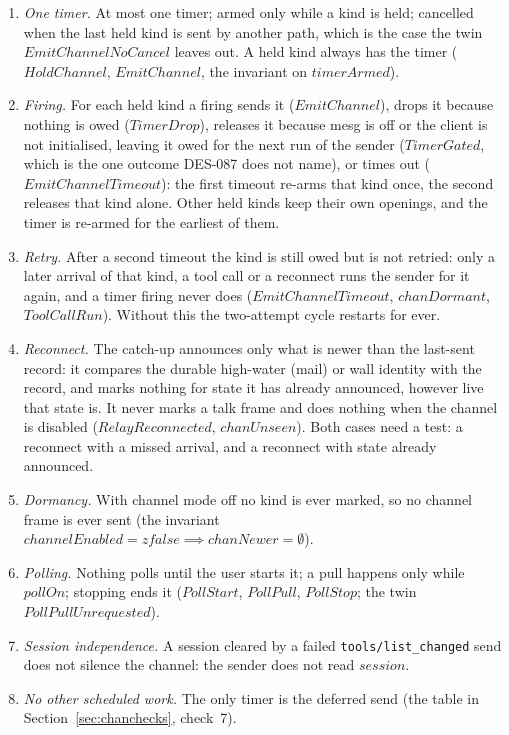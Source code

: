 \documentclass[a4paper,10pt,fleqn]{article}
\begin{document}
\begin{enumerate}
    $rateLimit$ in a sliding ten minutes, tested with a fake clock; arrivals
    in a window coalesce into the next event ($WindowOpen$, $HoldChannel$;
    the twin $EmitChannelBurst$).
  \item \emph{One timer.}  At most one timer; armed only while a kind is
    held; cancelled when the last held kind is sent by another path, which
    is the case the twin $EmitChannelNoCancel$ leaves out.  A held kind
    always has the timer ($HoldChannel$, $EmitChannel$, the invariant on
    $timerArmed$).
  \item \emph{Firing.}  For each held kind a firing sends it ($EmitChannel$),
    drops it because nothing is owed ($TimerDrop$), releases it because mesg
    is off or the client is not initialised, leaving it owed for the next
    run of the sender ($TimerGated$, which is the one outcome DES-087 does
    not name), or times out ($EmitChannelTimeout$): the first timeout
    re-arms that kind once, the second releases that kind alone.  Other held
    kinds keep their own openings, and the timer is re-armed for the earliest
    of them.
  \item \emph{Retry.}  After a second timeout the kind is still owed but is
    not retried: only a later arrival of that kind, a tool call or a
    reconnect runs the sender for it again, and a timer firing never does
    ($EmitChannelTimeout$, $chanDormant$, $ToolCallRun$).  Without this
    the two-attempt cycle restarts for ever.
  \item \emph{Reconnect.}  The catch-up announces only what is newer than
    the last-sent record: it compares the durable high-water (mail) or wall
    identity with the record, and marks nothing for state it has already
    announced, however live that state is.  It never marks a talk frame and
    does nothing when the channel is disabled ($RelayReconnected$,
    $chanUnseen$).  Both cases need a test: a reconnect with a missed
    arrival, and a reconnect with state already announced.
  \item \emph{Dormancy.}  With channel mode off no kind is ever marked, so
    no channel frame is ever sent (the invariant
    $channelEnabled = zfalse \implies chanNewer = \emptyset$).
  \item \emph{Polling.}  Nothing polls until the user starts it; a pull
    happens only while $pollOn$; stopping ends it ($PollStart$,
    $PollPull$, $PollStop$; the twin $PollPullUnrequested$).
  \item \emph{Session independence.}  A session cleared by a failed
    \texttt{tools/list\_changed} send does not silence the channel: the
    sender does not read $session$.
  \item \emph{No other scheduled work.}  The only timer is the deferred send
    (the table in Section~\ref{sec:chanchecks}, check~7).
\end{enumerate}
\end{document}
